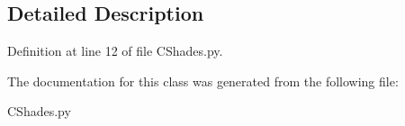 \subsection{Detailed Description}


Definition at line 12 of file C\+Shades.\+py.



The documentation for this class was generated from the following file\+:\begin{DoxyCompactItemize}
\item 
C\+Shades.\+py\end{DoxyCompactItemize}
